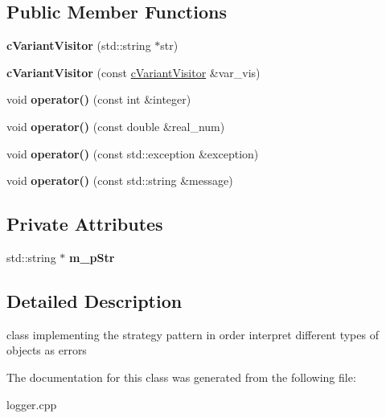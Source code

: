 \subsection*{\-Public \-Member \-Functions}
\begin{DoxyCompactItemize}
\item 
\hypertarget{classengine_1_1cVariantVisitor_a4dfcf482b3b84120ab323aa9303058f0}{{\bfseries c\-Variant\-Visitor} (std\-::string $\ast$str)}\label{classengine_1_1cVariantVisitor_a4dfcf482b3b84120ab323aa9303058f0}

\item 
\hypertarget{classengine_1_1cVariantVisitor_ab49278c7d44ba02e5a411063cb5e5593}{{\bfseries c\-Variant\-Visitor} (const \hyperlink{classengine_1_1cVariantVisitor}{c\-Variant\-Visitor} \&var\-\_\-vis)}\label{classengine_1_1cVariantVisitor_ab49278c7d44ba02e5a411063cb5e5593}

\item 
\hypertarget{classengine_1_1cVariantVisitor_a194e92aa8a44b02c29dbe14a5a049493}{void {\bfseries operator()} (const int \&integer)}\label{classengine_1_1cVariantVisitor_a194e92aa8a44b02c29dbe14a5a049493}

\item 
\hypertarget{classengine_1_1cVariantVisitor_ad72499c182f11280fa498773ffc8bd3c}{void {\bfseries operator()} (const double \&real\-\_\-num)}\label{classengine_1_1cVariantVisitor_ad72499c182f11280fa498773ffc8bd3c}

\item 
\hypertarget{classengine_1_1cVariantVisitor_a1f1bc8f29028034cddb07f1781e56e81}{void {\bfseries operator()} (const std\-::exception \&exception)}\label{classengine_1_1cVariantVisitor_a1f1bc8f29028034cddb07f1781e56e81}

\item 
\hypertarget{classengine_1_1cVariantVisitor_afdfa31a083e06c49529beeea2557dce4}{void {\bfseries operator()} (const std\-::string \&message)}\label{classengine_1_1cVariantVisitor_afdfa31a083e06c49529beeea2557dce4}

\end{DoxyCompactItemize}
\subsection*{\-Private \-Attributes}
\begin{DoxyCompactItemize}
\item 
\hypertarget{classengine_1_1cVariantVisitor_a0392f224211e16af4b2c72afa2df4257}{std\-::string $\ast$ {\bfseries m\-\_\-p\-Str}}\label{classengine_1_1cVariantVisitor_a0392f224211e16af4b2c72afa2df4257}

\end{DoxyCompactItemize}


\subsection{\-Detailed \-Description}
class implementing the strategy pattern in order interpret different types of objects as errors 

\-The documentation for this class was generated from the following file\-:\begin{DoxyCompactItemize}
\item 
logger.\-cpp\end{DoxyCompactItemize}

